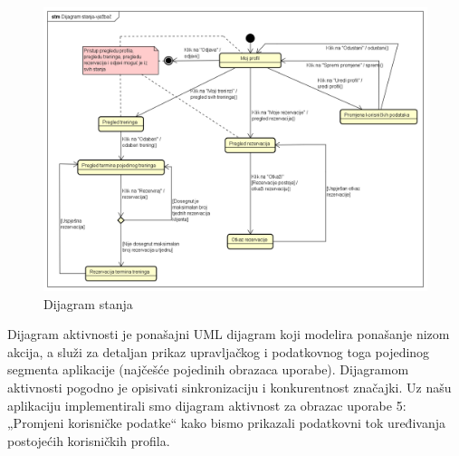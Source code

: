 	\begin{figure}[H]
		 \centering
		 \includegraphics[width=\linewidth]{./Dijagrami/dijagramStanja-vjezbac.png}
		 \caption{Dijagram stanja}
		 \label{fig:Dijagram stanja}
	\end{figure}
		
	
		
		
        \noindent \newline Dijagram aktivnosti je ponašajni UML dijagram koji modelira ponašanje nizom akcija, a služi za detaljan prikaz upravljačkog i podatkovnog toga pojedinog segmenta aplikacije (najčešće pojedinih obrazaca uporabe). Dijagramom aktivnosti pogodno je opisivati sinkronizaciju i konkurentnost značajki. 
        \newline Uz našu aplikaciju implementirali smo dijagram aktivnost za obrazac uporabe 5:  „Promjeni korisničke podatke“ kako bismo prikazali podatkovni tok uređivanja postojećih korisničkih profila. 

